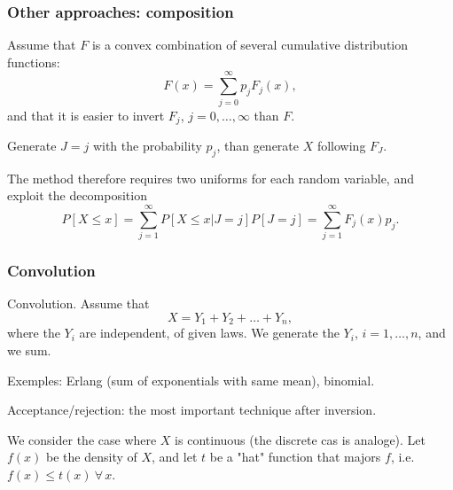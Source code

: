 \documentclass{beamer}
\begin{document}
	\begin{frame}
		\frametitle{Other approaches: composition}
		
		Assume that $F$ is a convex combination of several cumulative
		distribution functions:
		\[
		F (x) = \sum_{j = 0}^{\infty} p_j F_j (x),
		\]
		and that it is easier to invert $F_j$, $j = 0,\ldots,\infty$ than $F$.
		
		\mbox{}
		
		Generate $J = j$ with the probability $p_j$, than generate $X$
		following $F_J$.
		
		\mbox{}
		
		The method therefore requires two uniforms for each random variable,
		and exploit the decomposition
		\[
		P[ X \leq x ] = \sum_{j = 1}^{\infty} P[ X \leq x | J = j] P[J = j] = \sum_{j = 1}^{\infty} F_j(x)p_j.
		\]
		
	\end{frame}
	
	\begin{frame}
		\frametitle{Convolution}
		
		{\red Convolution}. Assume that
		\[
		X = Y_1 + Y_2 + \ldots + Y_n,
		\]
		where the $Y_i$ are independent, of given laws.
		We generate the $Y_i$, $i = 1,\ldots,n$, and we sum.
		
		\mbox{}
		
		Exemples: Erlang (sum of exponentials with same mean), binomial.
		
		\mbox{}
		
		\mbox{}
		
		{\red Acceptance/rejection}: the most important technique after inversion.
		
		\mbox{}
		
		We consider the case where $X$ is continuous (the discrete cas is
		analoge).
		Let $f(x)$ be the density of $X$, and let $t$ be a "hat" function that
		majors $f$, i.e. $f (x) \leq t(x)\ \forall\, x$.
		
	\end{frame}
	
\end{document}

